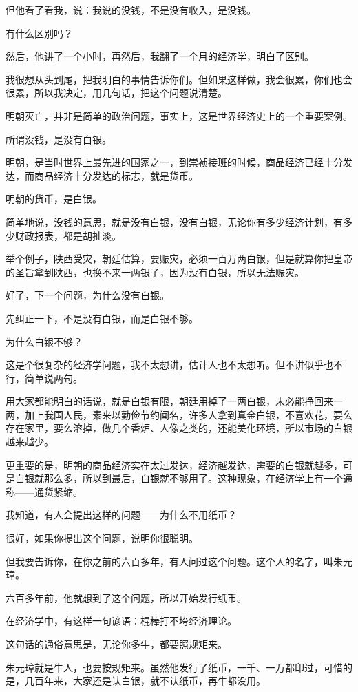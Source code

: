 \begin{multicols}{\theparacolNo}
但他看了看我，说：我说的没钱，不是没有收入，是没钱。

有什么区别吗？

然后，他讲了一个小时，再然后，我翻了一个月的经济学，明白了区别。

我很想从头到尾，把我明白的事情告诉你们。但如果这样做，我会很累，你们也会很累，所以我决定，用几句话，把这个问题说清楚。

明朝灭亡，并非是简单的政治问题，事实上，这是世界经济史上的一个重要案例。

所谓没钱，是没有白银。

明朝，是当时世界上最先进的国家之一，到崇祯接班的时候，商品经济已经十分发达，而商品经济十分发达的标志，就是货币。

明朝的货币，是白银。

简单地说，没钱的意思，就是没有白银，没有白银，无论你有多少经济计划，有多少财政报表，都是胡扯淡。

举个例子，陕西受灾，朝廷估算，要赈灾，必须一百万两白银，但是就算你把皇帝的圣旨拿到陕西，也换不来一两银子，因为没有白银，所以无法赈灾。

好了，下一个问题，为什么没有白银。

先纠正一下，不是没有白银，而是白银不够。

为什么白银不够？

这是个很复杂的经济学问题，我不太想讲，估计人也不太想听。但不讲似乎也不行，简单说两句。

用大家都能明白的话说，就是白银有限，朝廷用掉了一两白银，未必能挣回来一两，加上我国人民，素来以勤俭节约闻名，许多人拿到真金白银，不喜欢花，要么存在家里，要么溶掉，做几个香炉、人像之类的，还能美化环境，所以市场的白银越来越少。

更重要的是，明朝的商品经济实在太过发达，经济越发达，需要的白银就越多，可是白银就那么多，所以到最后，白银就不够用了。这种现象，在经济学上有一个通称——通货紧缩。

我知道，有人会提出这样的问题——为什么不用纸币？

很好，如果你提出这个问题，说明你很聪明。

但我要告诉你，在你之前的六百多年，有人问过这个问题。这个人的名字，叫朱元璋。

六百多年前，他就想到了这个问题，所以开始发行纸币。

在经济学中，有这样一句谚语：棍棒打不垮经济理论。

这句话的通俗意思是，无论你多牛，都要照规矩来。

朱元璋就是牛人，也要按规矩来。虽然他发行了纸币，一千、一万都印过，可惜的是，几百年来，大家还是认白银，就不认纸币，再牛都没用。


\end{multicols}
